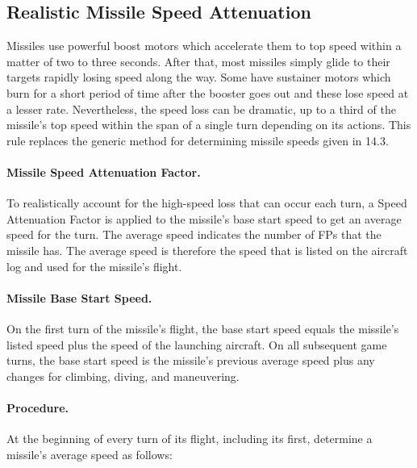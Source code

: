 \begin{advancedrules}

\section{Realistic Missile Speed Attenuation}


Missiles use powerful boost motors which accelerate them to top speed within a matter of two to three seconds. After that, most missiles simply glide to their targets rapidly losing speed along the way.  Some have sustainer motors which burn for a short period of time after the booster goes out and these lose speed at a lesser rate. Nevertheless, the speed loss can be dramatic, up to a third of the missile's top speed within the span of a single turn depending on its actions. This rule replaces the generic method for determining missile speeds given in 14.3.

\paragraph{Missile Speed Attenuation Factor.} To realistically account for the high-speed loss that can occur each turn, a Speed Attenuation Factor is applied to the missile's base start speed to get an average speed for the turn. The average speed indicates the number of FPs that the missile has. The average speed is therefore the speed that is listed on the aircraft log and used for the missile's flight.

\paragraph{Missile Base Start Speed.} On the first turn of the missile's flight, the base start speed equals the missile's listed speed  plus the speed of the launching aircraft. On all subsequent game turns, the base start speed is the missile's previous average speed plus any changes for climbing, diving, and maneuvering.

\paragraph{Procedure.} At the beginning of every turn of its flight, including its first, determine a missile's average speed as follows:


\end{advancedrules}
